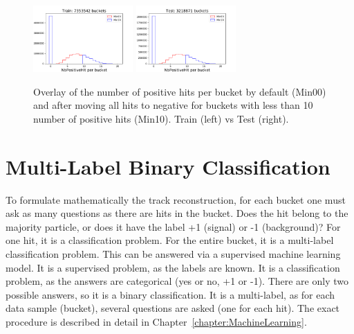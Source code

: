 \begin{figure}[htb]
\centering
\includegraphics[width=0.34\textwidth]{plots/plot_bucket_unbalanced_Train.pdf}
\includegraphics[width=0.34\textwidth]{plots/plot_bucket_unbalanced_Test.pdf}
\caption{Overlay of the number of positive hits per bucket by default (Min00) and after moving all hits to negative for buckets with less than 10 number of positive hits (Min10). Train (left) vs Test (right).}
\label{fig:BucketUnbalanced}
\end{figure}

\section{Multi-Label Binary Classification}
\label{sec:MultiLabelBinaryClassification}

To formulate mathematically the track reconstruction, for each bucket one must ask as many questions as there are hits in the bucket. Does the hit belong to the majority particle, or does it have the label +1 (signal) or -1 (background)? For one hit, it is a classification problem. For the entire bucket, it is a multi-label classification problem. This can be answered via a supervised machine learning model. It is a supervised problem, as the labels are known. It is a classification problem, as the answers are categorical (yes or no, +1 or -1). There are only two possible answers, so it is a binary classification. It is a multi-label, as for each data sample (bucket), several questions are asked (one for each hit). The exact procedure is described in detail in Chapter~\ref{chapter:MachineLearning}.
